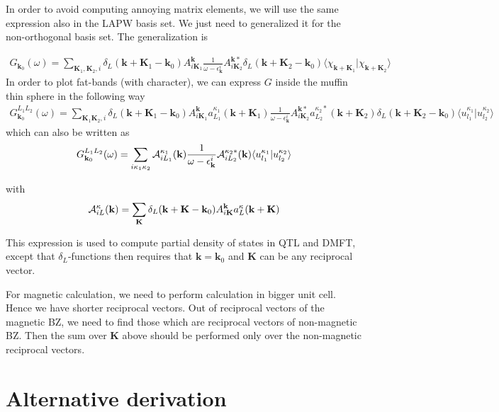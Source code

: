 \documentclass[aps,prb,floatfix,epsfig,twocolumn,showpacs,preprintnumbers]{revtex4}
\newcommand{\vk}{{\mathbf{k}}}
\newcommand{\vK}{{\mathbf{K}}}
\begin{document}
In order to avoid computing annoying matrix elements, we will use the
same expression also in the LAPW basis set. We just need to
generalized it for the non-orthogonal basis set.
The generalization is
\begin{widetext}
\begin{eqnarray}
G_{\vk_0}(\omega)=\sum_{\vK_1,\vK_2,i}\delta_L(\vk+\vK_1-\vk_0)A_{i\vK_1}^\vk\frac{1}{\omega-\epsilon_\vk^i}A_{i\vK_2}^{\vk *} \delta_L(\vk+\vK_2-\vk_0)\langle\chi_{\vk+\vK_1}|\chi_{\vk+\vK_2}\rangle
\end{eqnarray}
In order to plot fat-bands (with character), we can express $G$ inside
the muffin thin sphere in the following way
\begin{eqnarray}
G_{\vk_0}^{L_1  L_2}(\omega)=\sum_{\vK_1\vK_2,i}\delta_L(\vk+\vK_1-\vk_0)A_{i\vK_1}^\vk
a_{L_1}^{\kappa_1}(\vk+\vK_1)\frac{1}{\omega-\epsilon_\vk^i}A_{i\vK_2}^{\vk  *} a_{L_2}^{\kappa_2 *}(\vk+\vK_2)\delta_L(\vk+\vK_2-\vk_0)\langle u_{l_1}^{\kappa_1}|u_{l_2}^{\kappa_2}\rangle
\end{eqnarray}
which can also be written as
\begin{eqnarray}
G_{\vk_0}^{L_1  L_2}(\omega)=\sum_{i\kappa_1\kappa_2}
{\cal A}_{i L_1}^{\kappa_1}(\vk)
\frac{1}{\omega-\epsilon_\vk^i}
{\cal A}_{i L_2}^{\kappa_2 *}(\vk)
\langle u_{l_1}^{\kappa_1}|u_{l_2}^{\kappa_2}\rangle
\end{eqnarray}
\end{widetext}
with
\begin{equation}
{\cal A}_{i L}^{\kappa}(\vk)=\sum_{\vK}\delta_L(\vk+\vK-\vk_0)A_{i\vK}^\vk a_{L}^{\kappa}(\vk+\vK)
\end{equation}

This expression is used to compute partial density of states in QTL
and DMFT, except that $\delta_L$-functions then requires that
$\vk=\vk_0$ and $\vK$ can be any reciprocal vector.

For magnetic calculation, we need to perform calculation in bigger
unit cell. Hence we have shorter reciprocal vectors. Out of reciprocal
vectors of the magnetic BZ, we need to find those which are reciprocal
vectors of non-magnetic BZ. Then the sum over $\vK$ above should be
performed only over the non-magnetic reciprocal vectors.


\section{Alternative derivation}
\end{document}
